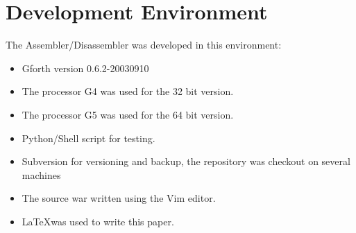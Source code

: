 \section{Development Environment}

The Assembler/Disassembler was developed in this environment:

\begin{itemize}
    \item Gforth version 0.6.2-20030910
    \item The processor G4 was used for the 32 bit version.
    \item The processor G5 was used for the 64 bit version.
    \item Python/Shell script for testing.
    \item Subversion for versioning and backup, the repository 
    was checkout on several machines
    \item The source war written using the Vim editor.
    \item \LaTeX was used to write this paper.
\end{itemize}
